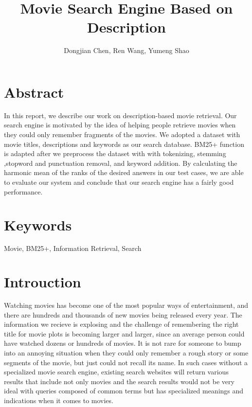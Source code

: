 \documentclass[letterpaper,10pt]{article}
\title{Movie Search Engine Based on Description}
\author{Dongjian Chen, Ren Wang, Yumeng Shao}
\begin{document}
\maketitle



\begin{multicols}{2}
    \section*{Abstract}
    In this report, we describe our work on description-based movie retrieval. Our search engine is motivated by the idea of helping people retrieve movies when they could only remember fragments of the movies. We adopted a dataset with movie titles, descriptions and keywords as our search database. BM25+ function is adapted after we preprocess the dataset with with tokenizing, stemming ,stopword and punctuation removal, and keyword addition. By calculating the harmonic mean of the ranks of the desired answers in our test cases, we are able to evaluate our system and conclude that our search engine has a fairly good performance. 

    \section*{Keywords}

    Movie, BM25+, Information Retrieval, Search

    \vfill\null
    \columnbreak


    \section{Introuction}

    Watching movies has become one of the most popular ways of entertainment, and there are hundreds and thousands of new movies being released every year. The information we recieve is explosing and the challenge of remembering the right title for movie plots is becoming larger and larger, since an average person could have watched dozens or hundreds of movies. It is not rare for someone to bump into an annoying situation when they could only remember a rough story or some segments of the movie, but just could not recall its name. In such cases without a specialized movie search engine, existing search websites will return various results that include not only movies and the search results would not be very ideal with queries composed of common terms but has specialized meanings and indications when it comes to movies.


\end{multicols}
\end{document}
